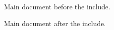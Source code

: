 \documentclass{article}
\begin{document}
Main document before the include.

Main document after the include.
\end{document}
